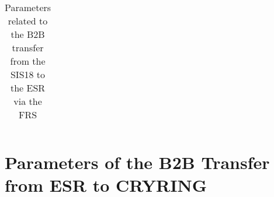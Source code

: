 \begin{longtable}{ | c | c | c | c | }
\caption{Parameters related to the B2B transfer from the SIS18 to the ESR via the FRS}
\label{18toESRvia the FRS}
    \end{longtable}
 
 


\newpage
\section{Parameters of the B2B Transfer from ESR to CRYRING}
\label{tab:ESRtoCRYRING}


